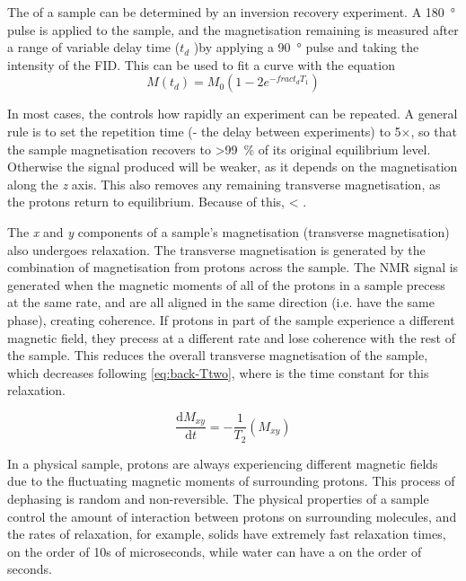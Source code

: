 The \Tone of a sample can be determined by an inversion recovery experiment.
A \SI{180}{\degree} pulse is applied to the sample, and the magnetisation remaining is measured after a range of variable delay time ($t_d$ )by applying a \SI{90}{\degree} pulse and taking the intensity of the FID.
This can be used to fit a curve with the equation
\begin{displaymath}
M(t_d) = M_0 (1 - 2 e^{-frac{t_d}{T_1}})
\end{displaymath}

In most cases, the \Tone controls how rapidly an experiment can be repeated.
A general rule is to set the repetition time (\TR - the delay between experiments) to 5$\times$\Tone, so that the sample magnetisation recovers to \SI{>99}{\percent} of its original equilibrium level.
Otherwise the signal produced will be weaker, as it depends on the magnetisation along the \textit{z} axis.
This also removes any remaining transverse magnetisation, as the protons return to equilibrium.
Because of this, \Ttwo < \Tone.

The \textit{x} and \textit{y} components of a sample's magnetisation (transverse magnetisation) also undergoes relaxation.
The transverse magnetisation is generated by the combination of magnetisation from protons across the sample.
The NMR signal is generated when the magnetic moments of all of the protons in a sample precess at the same rate, and are all aligned in the same direction (i.e. have the same phase), creating coherence.
If protons in part of the sample experience a different magnetic field, they precess at a different rate and lose coherence with the rest of the sample.
This reduces the overall transverse magnetisation of the sample, which decreases following \autoref{eq:back-Ttwo}, where \Ttwo is the time constant for this relaxation.

\begin{equation}
\frac{\mathrm{d}M_{xy}}{\mathrm{d}t} = - \frac{1}{T_2} (M_{xy})
\label{eq:back-Ttwo}
\end{equation}

In a physical sample, protons are always experiencing different magnetic fields due to the fluctuating magnetic moments of surrounding protons.
This process of dephasing is random and non-reversible.
The physical properties of a sample control the amount of interaction between protons on surrounding molecules, and the rates of \Ttwo relaxation, for example, solids have extremely fast \Ttwo relaxation times, on the order of 10s of microseconds, while water can have a \Ttwo on the order of seconds.

